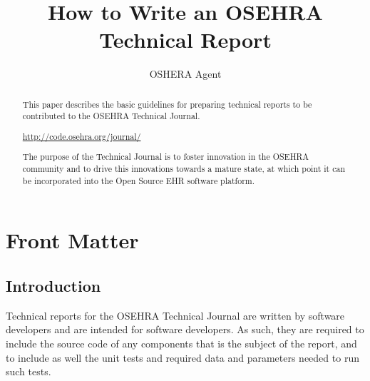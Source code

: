 \documentclass{OSEHRAArticle}
\title{How to Write an OSEHRA Technical Report}
\author{OSHERA Agent}
\newcommand{\OTJhandlerIDnumber}{2}
\begin{document}
%
%
\OTJhandlefooter{\OTJhandlerIDnumber}


\ifpdf
\else
\fi


\maketitle


\ifhtml
\chapter*{Front Matter\label{front}}
\fi


\begin{abstract}
\noindent
This paper describes the basic guidelines for preparing technical
reports to be contributed to the OSEHRA Technical Journal.

\begin{center}
\url{http://code.osehra.org/journal/}
\end{center}

The purpose of the Technical Journal is to foster innovation in the OSEHRA
community and to drive this innovations towards a mature state, at which point
it can be incorporated into the Open Source EHR software platform.
\end{abstract}

\tableofcontents

\section{Introduction}

Technical reports for the OSEHRA Technical Journal are written by software
developers and are intended for software developers. As such, they are required
to include the source code of any components that is the subject of the report,
and to include as well the unit tests and required data and parameters needed
to run such tests.
\end{document}
